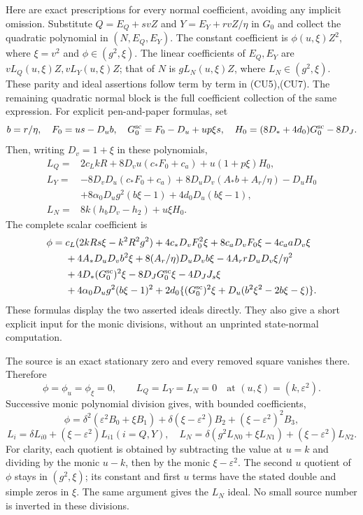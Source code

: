 Here are exact prescriptions for every normal coefficient, avoiding
any implicit omission. Substitute $Q=E_Q+svZ$ and
$Y=E_Y+rvZ/\eta$ in $G_0$ and collect the quadratic polynomial
in $(N,E_Q,E_Y)$. The constant coefficient is $\phi(u,\xi)Z^2$,
where $\xi=v^2$ and $\phi\in(g^2,\xi)$. The linear coefficients
of $E_Q,E_Y$ are $vL_Q(u,\xi)Z,vL_Y(u,\xi)Z$; that of $N$ is
$gL_N(u,\xi)Z$, where $L_N\in(g^2,\xi)$. These parity and ideal
assertions follow term by term in (CU5),(CU7). The remaining quadratic
normal block is the full coefficient collection of the same expression.
For explicit pen-and-paper formulas, set
\[
 b=r/\eta,\quad F_0=us-D_ub,\quad
 G_0^{\rm sc}=F_0-D_u+up\xi s,\quad
 H_0=(8D_*+4d_0)G_0^{\rm sc}-8D_J.
\]
Then, writing $D_v=1+\xi$ in these polynomials,
\begin{align*}
 L_Q={}&2c_LkR+8D_vu(c_*F_0+c_a)+u(1+p\xi)H_0,\\
 L_Y={}&-8D_vD_u(c_*F_0+c_a)
       +8D_uD_v(A_*b+A_r/\eta)-D_uH_0\\
      &+8\alpha_0D_ug^2(b\xi-1)+4d_0D_u(b\xi-1),\\
 L_N={}&8k(h_bD_v-h_2)+u\xi H_0.
\end{align*}
The complete scalar coefficient is
\begin{align*}
 \phi={}&c_L(2kRs\xi-k^2R^2g^2)
   +4c_*D_vF_0^2\xi+8c_aD_vF_0\xi-4c_aaD_v\xi\\
 &+4A_*D_uD_vb^2\xi+8(A_r/\eta)D_uD_vb\xi
                    -4A_rrD_uD_v\xi/\eta^2\\
 &+4D_*(G_0^{\rm sc})^2\xi-8D_JG_0^{\rm sc}\xi-4D_JJ_s\xi\\
 &+4\alpha_0D_ug^2(b\xi-1)^2
   +2d_0\{(G_0^{\rm sc})^2\xi+D_u(b^2\xi^2-2b\xi-\xi)\}.
\end{align*}
These formulas display the two asserted ideals directly. They also
give a short explicit input for the monic divisions, without an
unprinted state-normal computation.

The source is an exact stationary zero and every removed square
vanishes there. Therefore
\[
 \phi=\phi_u=\phi_\xi=0,\qquad L_Q=L_Y=L_N=0
                       \quad\text{at }(u,\xi)=(k,\varepsilon^2).
\]
Successive monic polynomial division gives, with bounded coefficients,
\[
 \phi=\delta^2(\varepsilon^2B_0+\xi B_1)
       +\delta(\xi-\varepsilon^2)B_2
       +(\xi-\varepsilon^2)^2B_3,                  \tag{CU8}
\]
\[
 L_i=\delta L_{i0}+(\xi-\varepsilon^2)L_{i1} (i=Q,Y),\quad
 L_N=\delta(g^2L_{N0}+\xi L_{N1})
                         +(\xi-\varepsilon^2)L_{N2}.
\]
For clarity, each quotient is obtained by subtracting the value at
$u=k$ and dividing by the monic $u-k$, then by the monic
$\xi-\varepsilon^2$. The second $u$ quotient of $\phi$ stays in
$(g^2,\xi)$; its constant and first $u$ terms have the stated double
and simple zeros in $\xi$. The same argument gives the $L_N$ ideal.
No small source number is inverted in these divisions.

